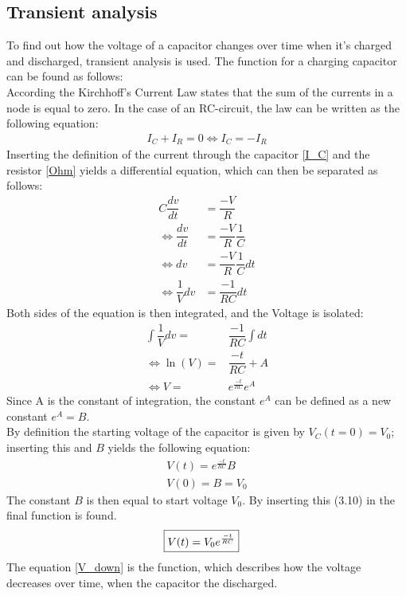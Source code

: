 \subsection{Transient analysis}
To find out how the voltage of a capacitor changes over time when it's charged and discharged, transient analysis is used. The function for a charging capacitor can be found as follows:
\\
According the Kirchhoff's Current Law states that the sum of the currents in a node is equal to zero. In the case of an RC-circuit, the law can be written as the following equation:
\begin{align*}
I_{C}+I_{R}=0 \Leftrightarrow 
I_{C}= -I_{R}
\end{align*}
Inserting the definition of the current through the capacitor \eqref{I_C} and the resistor \eqref{Ohm} yields a differential equation, which can then be separated as follows:
\begin{align*}
C \dfrac{dv}{dt}&=\dfrac{-V}{R} \\
\Leftrightarrow \dfrac{dv}{dt} &= \dfrac{-V}{R}\dfrac{1}{C} \\
\Leftrightarrow dv &= \dfrac{-V}{R}\dfrac{1}{C}dt \\
\Leftrightarrow \dfrac{1}{V}dv &= \dfrac{-1}{RC}dt
\end{align*}
Both sides of the equation is then integrated, and the Voltage is isolated:
\begin{align*}
\int \dfrac{1}{V}dv =& \dfrac{-1}{RC} \int dt \\
\Leftrightarrow \ln(V) =& \dfrac{-t}{RC} + A \\
\Leftrightarrow V =& e^{\frac{-t}{RC}}e^{A}
\end{align*}
Since A is the constant of integration, the constant $e^A$ can be defined as a new constant $e^A=B$.
\\
By definition the starting voltage of the capacitor is given by $V_C(t=0)=V_0$; inserting this and $B$ yields the following equation: 
\begin{align}
V(t)= e^{\frac{-t}{RC}}B \\
V(0)= B = V_0
\end{align}
The constant $B$ is then equal to start voltage $V_0$. By inserting this (3.10) in the final function is found.
\begin{align}
\label{V_down}
\Aboxed{
 V(t) = V_0e^{\frac{-t}{RC}}
 }
\end{align}
The equation \eqref{V_down} is the function, which describes how the voltage decreases over time, when the capacitor the discharged.
